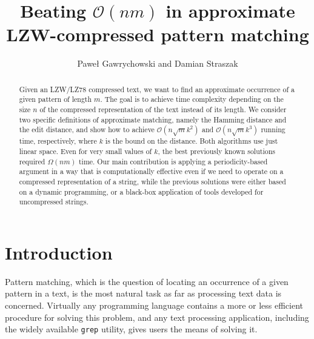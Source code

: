 \documentclass[runningheads]{llncs}
\begin{document}
\title{Beating $\mathcal{O}(nm)$ in approximate LZW-compressed pattern matching}

\author{Pawe\l{} Gawrychowski and Damian Straszak}
\authorrunning{}

\maketitle

\begin{abstract}
Given an LZW/LZ78 compressed text, we want to find an approximate occurrence of a given pattern of length $m$. The goal is to achieve time complexity
depending on the size $n$ of the compressed representation of the text instead of its length. We consider two specific definitions of approximate matching, namely the Hamming distance and the edit distance, and show how to achieve $\mathcal{O}(n\sqrt{m}k^{2})$ and $\mathcal{O}(n\sqrt{m}k^{3})$ running time, respectively, where $k$ is the bound on the distance. Both
algorithms use just linear space.
Even for very small values of $k$, the best previously known solutions required $\Omega(nm)$ time. Our main contribution is applying a periodicity-based argument in a way that is computationally effective even if we need to operate on a compressed representation of a string, while the previous solutions were either based on a dynamic programming, or a black-box application of tools developed for uncompressed strings.
\end{abstract}

\section{Introduction}

Pattern matching, which is the question of locating an occurrence of a given pattern in a text, is the most natural task as far as processing text data is concerned. Virtually any programming language contains a more or less efficient procedure for solving this problem, and any text processing application, including the widely available \texttt{grep} utility, gives users the means of solving it.
\end{document}
